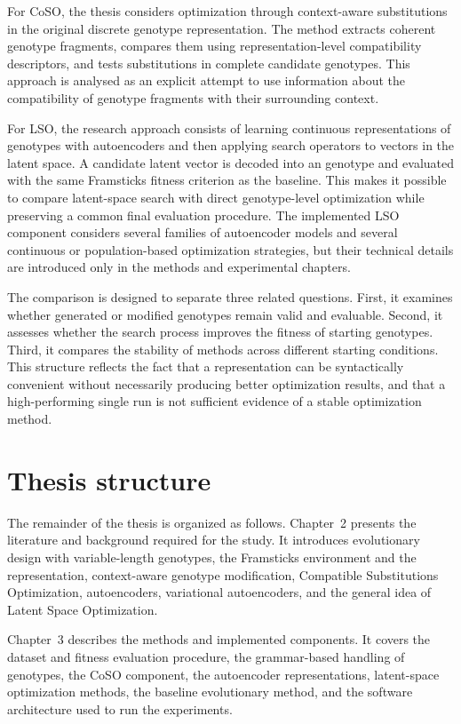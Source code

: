 For CoSO, the thesis considers optimization through context-aware substitutions in the original discrete genotype representation. The method extracts coherent genotype fragments, compares them using representation-level compatibility descriptors, and tests substitutions in complete candidate genotypes. This approach is analysed as an explicit attempt to use information about the compatibility of genotype fragments with their surrounding context.

For LSO, the research approach consists of learning continuous representations of \fone{} genotypes with autoencoders and then applying search operators to vectors in the latent space. A candidate latent vector is decoded into an \fone{} genotype and evaluated with the same Framsticks fitness criterion as the baseline. This makes it possible to compare latent-space search with direct genotype-level optimization while preserving a common final evaluation procedure. The implemented LSO component considers several families of autoencoder models and several continuous or population-based optimization strategies, but their technical details are introduced only in the methods and experimental chapters.

The comparison is designed to separate three related questions. First, it examines whether generated or modified genotypes remain valid and evaluable. Second, it assesses whether the search process improves the fitness of starting genotypes. Third, it compares the stability of methods across different starting conditions. This structure reflects the fact that a representation can be syntactically convenient without necessarily producing better optimization results, and that a high-performing single run is not sufficient evidence of a stable optimization method.


\section{Thesis structure}

The remainder of the thesis is organized as follows. Chapter~2 presents the literature and background required for the study. It introduces evolutionary design with variable-length genotypes, the Framsticks environment and the \fone{} representation, context-aware genotype modification, Compatible Substitutions Optimization, autoencoders, variational autoencoders, and the general idea of Latent Space Optimization.

Chapter~3 describes the methods and implemented components. It covers the dataset and fitness evaluation procedure, the grammar-based handling of \fone{} genotypes, the CoSO component, the autoencoder representations, latent-space optimization methods, the baseline evolutionary method, and the software architecture used to run the experiments.

